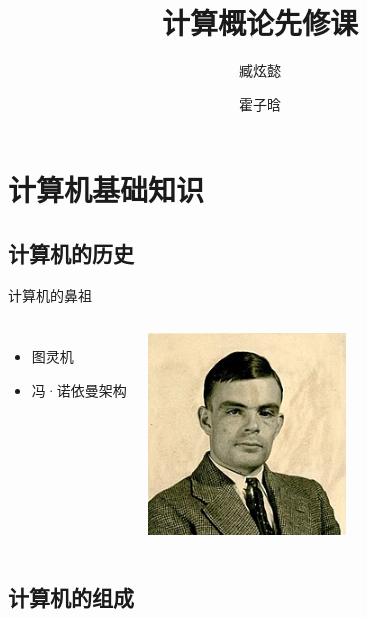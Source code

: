 \documentclass{beamer}
\title{计算概论先修课}
\author{臧炫懿 \and 霍子晗}
\institute{北京大学学生 Linux 俱乐部}
\begin{document}
\frame{\titlepage}

\section{计算机基础知识}

\subsection{计算机的历史}
\begin{frame}{计算机的鼻祖}
    \begin{columns}[T]
            \begin{itemize}
                \item <1->图灵机
                \item <2->冯·诺依曼架构
            \end{itemize}

            \includegraphics[width=0.9\textwidth]{1-1-Turing.jpg}
    \end{columns}
\end{frame}

\subsection{计算机的组成}
\end{document}
